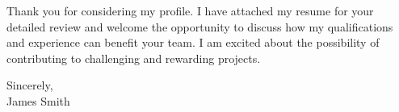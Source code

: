 \documentclass[a4paper,10pt]{article}
\begin{document}
\vspace{1em}

Thank you for considering my profile. I have attached my resume for your detailed review and welcome the opportunity to discuss how my qualifications and experience can benefit your team. I am excited about the possibility of contributing to challenging and rewarding projects.

\vspace{1em}

Sincerely, \\
\vspace{2em} %
James Smith
\end{document}
